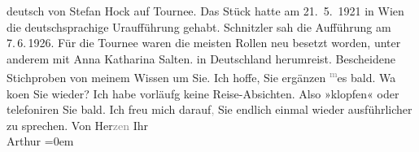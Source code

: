 \begin{ledgroupsized}[t]{13cm}
{{{                  deutsch von Stefan Hock auf Tournee. Das Stück hatte am 21. 5. 1921 in Wien
                  die deutschsprachige Uraufführung gehabt. Schnitzler sah die Aufführung am 7. 6. 1926.
                  Für die Tournee waren die meisten Rollen neu besetzt worden, unter anderem mit Anna Katharina Salten.}}}\label{K_L03022-6h}
               in Deutschland herumreist. Bescheidene Stichproben
               von meinem Wissen um Sie. Ich hoffe, Sie ergänzen \substVorne{}\textsuperscript{\textcolor{gray}{m}}\substDazwischen{}es\substHinten{} bald. Wa{\geminationn} ko{\geminationm}en Sie wieder? Ich
               habe vorläufg keine Reise-Absichten. Also »klopfen« oder telefoniren Sie bald. Ich
               freu mich darauf\textcolor{gray}{,} Sie endlich einmal wieder ausführlicher zu sprechen.\pend
           \pstart
           Von Her\textcolor{gray}{zen} Ihr {\\[\baselineskip]}\spacefill\mbox{Arthur}\pend
           \leftskip=0em{}
         
         \endnumbering{}\end{ledgroupsized}  \newcommand{\dateiname}{L03022}\newcommand{\titel}{Arthur Schnitzler an Felix Salten, 10. 2. 1927}\newcommand{\editorInnen}{Martin Anton Müller und Laura Untner}
      